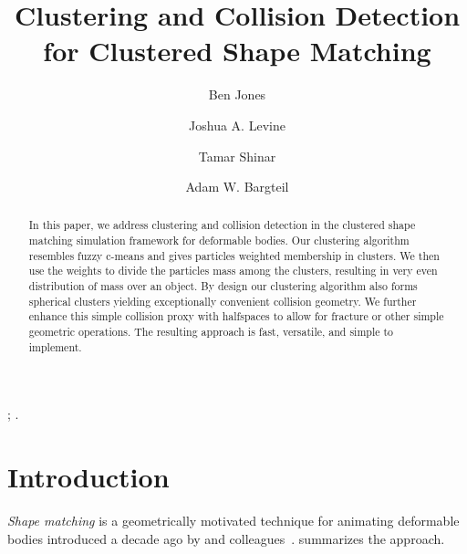 \documentclass[review]{acmsiggraph}
\title{Clustering and Collision Detection for Clustered Shape Matching}
\author[*]{Ben Jones}
\author[**]{Joshua A. Levine}
\author[***]{Tamar Shinar}
\author[*]{Adam W. Bargteil}
\affil[*]{University of Utah}
\affil[**]{Clemson University}
\affil[***]{University of California, Riverside}
\begin{document}


\maketitle

\begin{abstract}
In this paper, we address clustering and collision detection in the clustered shape matching simulation framework
for deformable bodies.  Our clustering algorithm resembles fuzzy c-means and gives particles weighted membership in clusters.
We then use the weights to divide the particles mass among the clusters, resulting in very even distribution of mass over an 
object.  By design our clustering algorithm also forms spherical clusters yielding exceptionally convenient collision geometry.  We further 
enhance this simple collision proxy with halfspaces to allow for fracture or other simple geometric operations.
The resulting approach is fast, versatile, and simple to implement.
\end{abstract}

\begin{CRcatlist}
  ;
  .
\end{CRcatlist}

\keywordlist


\copyrightspace

\section{Introduction}\label{sec:Introduction}
{\em Shape matching} is a geometrically motivated technique for animating deformable bodies introduced
a decade ago by \Mueller and colleagues~.
 summarizes the approach.
\end{document}

